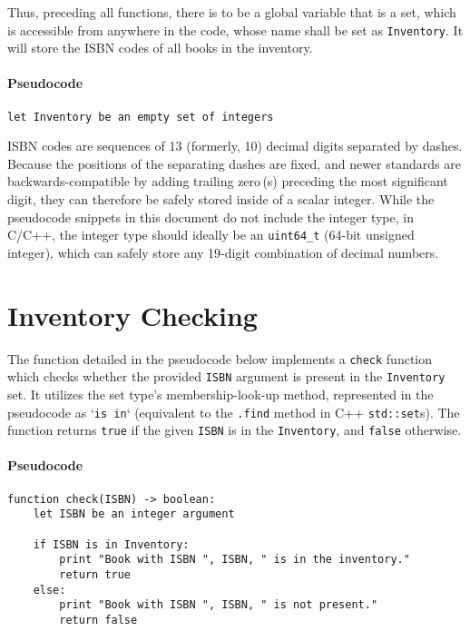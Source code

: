 \documentclass[12pt]{article}
\begin{document}
Thus, preceding all functions, there is to be a global variable that is a set, which is accessible from anywhere in the code, whose name shall be set as \texttt{Inventory}. It will store the ISBN codes of all books in the inventory.

\paragraph{Pseudocode}
\begin{verbatim}
let Inventory be an empty set of integers
\end{verbatim}

ISBN codes are sequences of 13 (formerly, 10) decimal digits separated by dashes. Because the positions of the separating dashes are fixed, and newer standards are backwards-compatible by adding trailing zero\,(s) preceding the most significant digit, they can therefore be safely stored inside of a scalar integer. While the pseudocode snippets in this document do not include the integer type, in C/C++, the integer type should ideally be an \texttt{uint64\_t} (64-bit unsigned integer), which can safely store any 19-digit combination of decimal numbers.

\pagebreak
\section{Inventory Checking}

The function detailed in the pseudocode below implements a \texttt{check} function which checks whether the provided \texttt{ISBN} argument is present in the \linebreak \texttt{Inventory} set. It utilizes the set type's membership-look-up method, represented in the pseudocode as `\texttt{is in}` (equivalent to the \texttt{.find} method in C++ \texttt{std::set}s). The function returns \texttt{true} if the given \texttt{ISBN} is in the \texttt{Inventory}, and \texttt{false} otherwise.

\paragraph{Pseudocode}
\begin{verbatim}
function check(ISBN) -> boolean:
    let ISBN be an integer argument

    if ISBN is in Inventory:
        print "Book with ISBN ", ISBN, " is in the inventory."
        return true
    else:
        print "Book with ISBN ", ISBN, " is not present."
        return false
\end{verbatim}
\end{document}
